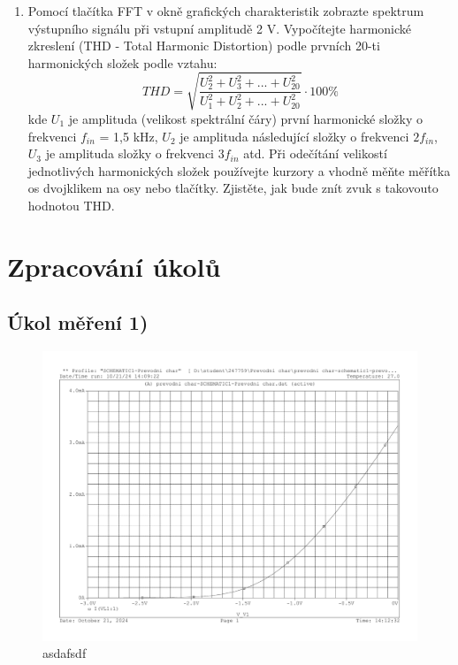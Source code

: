 \documentclass[a4paper, czech]{article}
\begin{document}
\begin{enumerate}
    \item Pomocí tlačítka FFT v okně grafických charakteristik zobrazte spektrum výstupního signálu při vstupní amplitudě 2 V. Vypočítejte harmonické zkreslení (THD - Total Harmonic Distortion) podle prvních 20-ti harmonických složek podle vztahu:
    \begin{equation*}
        THD = \sqrt{\frac{U_2^2 + U_3^2 + ... + U_{20}^2}{U_1^2 + U_2^2 + ... + U_{20}^2}} \cdot 100 \%
    \end{equation*}
    kde $U_1$ je amplituda (velikost spektrální čáry) první harmonické složky o frekvenci $f_{in}$ = 1,5 kHz, $U_2$ je amplituda následující složky o frekvenci $2 f_{in}$, $U_3$ je amplituda složky o frekvenci $3f_{in}$ atd. Při odečítání velikostí jednotlivých harmonických složek používejte kurzory a vhodně měňte měřítka os dvojklikem na osy nebo tlačítky. Zjistěte, jak bude znít zvuk s takovouto hodnotou THD.
\end{enumerate}

\section{Zpracování úkolů}

\subsection{Úkol měření 1)}

\begin{figure}[H]
    \centering
    \includegraphics[width=\textwidth]{charakteristiky/ULOHA1.pdf}
    \caption{asdafsdf}
\end{figure}
\end{document}
